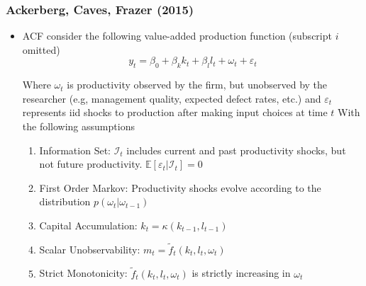 \documentclass{beamer}
\begin{document}

\begin{frame}
\frametitle{Ackerberg, Caves, Frazer (2015)}
\begin{itemize}
	\item ACF consider the following value-added production function (subscript $i$ omitted)
	\begin{equation}
	y_{t}=\beta_{0}+\beta_{k}k_{t}+\beta_{l}l_{t}+\omega_{t}+\varepsilon_{t}
	\end{equation}

	Where $\omega_{t}$ is productivity observed by the firm, but unobserved by the researcher (e.g, management quality, expected defect rates, etc.) and $\varepsilon_{t}$ represents iid shocks to production after making input choices at time $t$
	With the following assumptions
	\medskip
	\begin{enumerate}
		\item Information Set: $\mathcal{I}_{t}$ includes current and past productivity shocks, but not future productivity. $\mathbb{E}[\varepsilon_{t}|\mathcal{I}_{t}]=0$
		\item First Order Markov: Productivity shocks evolve according to the distribution $p(\omega_{t}|\omega_{t-1})$
		\item Capital Accumulation: $k_{t}=\kappa(k_{t-1}, l_{t-1})$
		\item Scalar Unobservability: $m_{t}=\tilde{f}_{t}(k_{t}, l_{t}, \omega_{t})$
		\item Strict Monotonicity: $\tilde{f}_{t}(k_{t}, l_{t}, \omega_{t})$ is strictly increasing in $\omega_{t}$
	\end{enumerate}
\end{itemize}
\end{frame}

\end{document}
